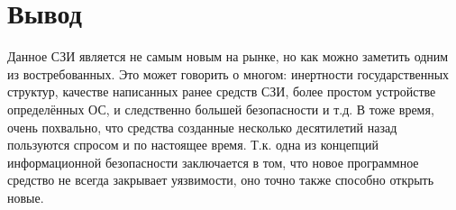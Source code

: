 \section{Вывод}
Данное СЗИ является не самым новым на рынке, но как можно заметить одним из востребованных.
Это может говорить о многом:
инертности государственных структур,
качестве написанных ранее средств СЗИ,
более простом устройстве определённых ОС, и следственно большей безопасности
и т.д.
В тоже время, очень похвально, 
что средства созданные несколько десятилетий назад 
пользуются спросом и по настоящее время.
Т.к. одна из концепций информационной безопасности заключается в том, 
что новое программное средство не всегда закрывает уязвимости, 
оно точно также способно открыть новые.

